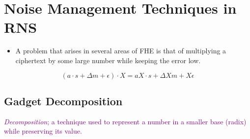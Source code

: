 \newpage
\section{Noise Management Techniques in RNS}
\begin{itemize}
    \item A problem that arises in several areas of FHE is that of multiplying a ciphertext by some large number while keeping the error low.
\end{itemize}

\begin{equation}
    (a\cdot s + \Delta m + \epsilon) \cdot X = aX\cdot s + \Delta Xm + X\epsilon
\end{equation}



\subsection{Gadget Decomposition}
\textcolor{purple}{\textit{Decomposition}; a technique used to represent a number in a smaller base (radix) while preserving its value.} %

